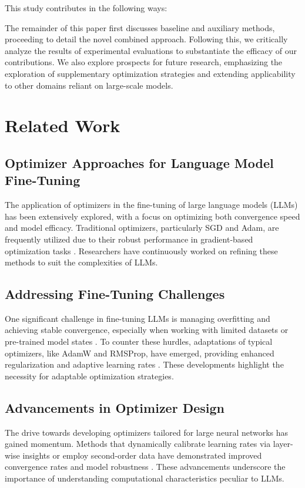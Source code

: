 \documentclass{article} %
\begin{document}
This study contributes in the following ways:

The remainder of this paper first discusses baseline and auxiliary methods, proceeding to detail the novel combined approach. Following this, we critically analyze the results of experimental evaluations to substantiate the efficacy of our contributions. We also explore prospects for future research, emphasizing the exploration of supplementary optimization strategies and extending applicability to other domains reliant on large-scale models.

\section{Related Work}
\label{sec:related}
\subsection{Optimizer Approaches for Language Model Fine-Tuning}
The application of optimizers in the fine-tuning of large language models (LLMs) has been extensively explored, with a focus on optimizing both convergence speed and model efficacy. Traditional optimizers, particularly SGD and Adam, are frequently utilized due to their robust performance in gradient-based optimization tasks \cite{differentiableSGD2016}. Researchers have continuously worked on refining these methods to suit the complexities of LLMs.

\subsection{Addressing Fine-Tuning Challenges}
One significant challenge in fine-tuning LLMs is managing overfitting and achieving stable convergence, especially when working with limited datasets or pre-trained model states \cite{overfitting2018}. To counter these hurdles, adaptations of typical optimizers, like AdamW and RMSProp, have emerged, providing enhanced regularization and adaptive learning rates \cite{optimizingLLMs2019}. These developments highlight the necessity for adaptable optimization strategies.

\subsection{Advancements in Optimizer Design}
The drive towards developing optimizers tailored for large neural networks has gained momentum. Methods that dynamically calibrate learning rates via layer-wise insights or employ second-order data have demonstrated improved convergence rates and model robustness \cite{sophisticatedOptimizers2020}. These advancements underscore the importance of understanding computational characteristics peculiar to LLMs.
\end{document}
